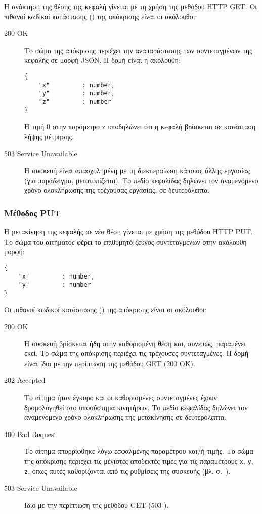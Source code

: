 Η ανάκτηση της θέσης της κεφαλή γίνεται με τη χρήση της μεθόδου HTTP GET. Οι
πιθανοί κωδικοί κατάστασης () της απόκρισης είναι οι ακόλουθοι:
\begin{description}
    \item[200 OK] Το σώμα της απόκρισης περιέχει την αναπαράστασης των
    συντεταγμένων της κεφαλής σε μορφή JSON. Η δομή είναι η ακόλουθη:
    \begin{lstlisting}
{
    "x"         : number,
    "y"         : number,
    "z"         : number
}
    \end{lstlisting}
    Η τιμή 0 στην παράμετρο \verb~z~ υποδηλώνει ότι η κεφαλή βρίσκεται σε
    κατάσταση λήψης μέτρησης.

    \item[503 Service Unavailable] Η συσκευή είναι απασχολημένη με τη
    διεκπεραίωση κάποιας άλλης εργασίας (για παράδειγμα, μετατοπίζεται). Το
    πεδίο κεφαλίδας  δηλώνει τον αναμενόμενο χρόνο ολοκλήρωσης
    της τρέχουσας εργασίας, σε δευτερόλεπτα.
\end{description}


\subsubsection{Μέθοδος PUT}

Η μετακίνηση της κεφαλής σε νέα θέση γίνεται με χρήση της μεθόδου HTTP PUT. Το
σώμα του αιτήματος φέρει το επιθυμητό ζεύγος συντεταγμένων στην ακόλουθη μορφή:
\begin{lstlisting}
{
    "x"         : number,
    "y"         : number
}
\end{lstlisting}
Οι πιθανοί κωδικοί κατάστασης () της απόκρισης είναι οι
ακόλουθοι:
\begin{description}
    \item[200 OK] Η συσκευή βρίσκεται ήδη στην καθορισμένη θέση και, συνεπώς,
    παραμένει εκεί. Το σώμα της απόκρισης περιέχει τις τρέχουσες συντεταγμένες.
    Η δομή είναι ίδια με την περίπτωση της μεθόδου GET (200 OK).

    \item[202 Accepted] Το αίτημα ήταν έγκυρο και οι καθορισμένες συντεταγμένες
    έχουν δρομολογηθεί στο υποσύστημα κινητήρων. Το πεδίο κεφαλίδας
     δηλώνει τον αναμενόμενο χρόνο ολοκλήρωσης της μετακίνησης
    σε δευτερόλεπτα.

    \item[400 Bad Request] Το αίτημα απορρίφθηκε λόγω εσφαλμένης παραμέτρου
    και\slash{}ή τιμής. Το σώμα της απόκρισης περιέχει τις μέγιστες αποδεκτές
    τιμές για τις παραμέτρους \verb~x~, \verb~y~, \verb~z~, όπως αυτές
    καθορίζονται από τις ρυθμίσεις της συσκευής (βλ.
    σ.~\pageref{ssubsec:network:config-get}).

    \item[503 Service Unavailable] Ίδιο με την περίπτωση της μεθόδου GET (503
    ).
\end{description}


